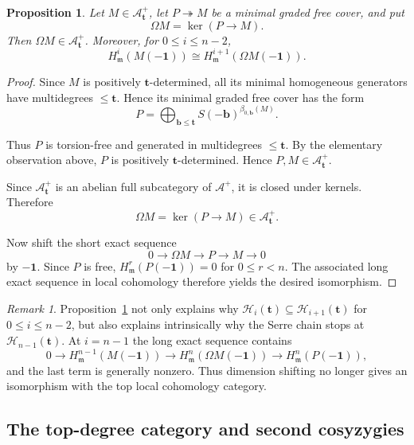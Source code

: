 \documentclass[12pt,reqno]{amsart}
\newtheorem{proposition}[theorem]{Proposition}
\theoremstyle{definition}
\theoremstyle{remark}
\newtheorem{remark}[theorem]{Remark}
\begin{document}
\begin{proposition}\label{prop:syzygy-filtration}
Let $M\in\mathcal A^+_{\mathbf t}$, let $P\twoheadrightarrow M$ be a minimal graded free cover, and put
$$
\Omega M=\ker(P\to M).
$$
Then $\Omega M\in\mathcal A^+_{\mathbf t}$. Moreover, for
$0\le i\le n-2$,
$$
H^i_{\mathfrak m}(M(-\mathbf1))
\cong
H^{i+1}_{\mathfrak m}(\Omega M(-\mathbf1)).
$$
\end{proposition}

\begin{proof}
Since $M$ is positively $\mathbf t$-determined, all its minimal homogeneous generators have multidegrees $\le \mathbf t$. Hence its minimal graded free cover has the form
$$
P=
\bigoplus_{\mathbf b\le \mathbf t}
S(-\mathbf b)^{\beta_{0,\mathbf b}(M)}.
$$

Thus $P$ is torsion-free and generated in multidegrees $\le \mathbf t$. By the elementary observation above, $P$ is positively $\mathbf t$-determined. Hence $P,M\in\mathcal A^+_{\mathbf t}.$


Since $\mathcal A^+_{\mathbf t}$ is an abelian full subcategory of $\mathcal A^+$, it is closed under kernels. Therefore
$$
\Omega M=\ker(P\to M)\in\mathcal A^+_{\mathbf t}.
$$

Now shift the short exact sequence
$$
0\longrightarrow\Omega M\longrightarrow P\longrightarrow M\longrightarrow0
$$
by $-\mathbf1$. Since $P$ is free, $H^r_{\mathfrak m}(P(-\mathbf1))=0$ for $0\le r<n$.
The associated long exact sequence in local cohomology therefore yields the desired isomorphism.
\end{proof}




\begin{remark}\label{rem:dimension-shift-stops}
Proposition~\ref{prop:syzygy-filtration} not only explains why $\mathcal H_i(\mathbf t)\subseteq\mathcal H_{i+1}(\mathbf t)$ for $0\le i\le n-2$, but also explains intrinsically why the Serre chain stops at
$\mathcal H_{n-1}(\mathbf t)$.  At $i=n-1$ the long exact sequence contains
\[
0\longrightarrow H^{n-1}_{\mathfrak m}(M(-\mathbf1))
\longrightarrow H^n_{\mathfrak m}(\Omega M(-\mathbf1))
\longrightarrow H^n_{\mathfrak m}(P(-\mathbf1)),
\]
and the last term is generally nonzero.  Thus dimension shifting no longer
gives an isomorphism with the top local cohomology category.
\end{remark}

\subsection{The top-degree category and second cosyzygies}
\end{document}
